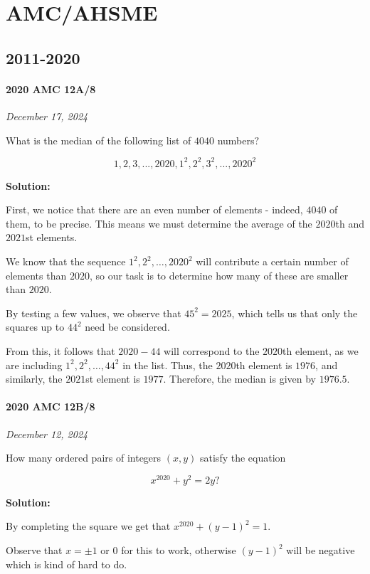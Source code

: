 \documentclass[../mathproblems.tex]{subfiles}
\begin{document}
\chapter{AMC/AHSME}
\section{2011-2020}
\subsubsection*{2020 AMC 12A/8}
\textit{December 17, 2024}

What is the median of the following list of $4040$ numbers$?$

$$1, 2, 3, ..., 2020, 1^2, 2^2, 3^2, ..., 2020^2$$

\textbf{Solution:}

First, we notice that there are an even number of elements - indeed, $4040$ of them, to be precise. This means we must determine the average of the $2020$th and $2021$st elements.

We know that the sequence $1^2, 2^2, \dots, 2020^2$ will contribute a certain number of elements than $2020$, so our task is to determine how many of these are smaller than $2020$.

By testing a few values, we observe that $45^2 = 2025$, which tells us that only the squares up to $44^2$ need be considered.

From this, it follows that $2020 - 44$ will correspond to the $2020$th element, as we are including $1^2, 2^2, \dots, 44^2$ in the list. Thus, the $2020$th element is $1976$, and similarly, the $2021$st element is $1977$. Therefore, the median is given by $\boxed{1976.5}$.

\noindent\hrulefill



\subsubsection*{2020 AMC 12B/8}
\textit{December 12, 2024}

How many ordered pairs of integers $(x, y)$ satisfy the equation 

\[x^{2020}+y^2=2y?\]

\textbf{Solution:}

By completing the square we get that $x^{2020}+(y-1)^2=1$.

Observe that $x=\pm 1$ or $0$ for this to work, otherwise $(y-1)^2$ will be negative which is kind of hard to do. 
\end{document}
